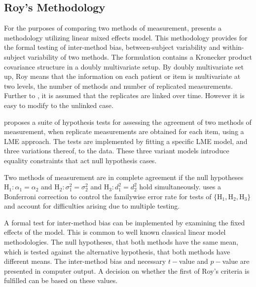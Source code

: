 \documentclass[12pt, a4paper]{report}
\theoremstyle{plain}
\theoremstyle{definition}
\theoremstyle{remark}
\begin{document}
			
			
			
			
			
			
			
			\subsection{Roy's Methodology}
			
			For the purposes of comparing two methods of measurement, \citet{ARoy2009} presents a methodology utilizing linear mixed effects model. This methodology provides for the formal testing of inter-method bias, between-subject variability and within-subject variability of two methods. The formulation contains a Kronecker product covariance structure in a doubly multivariate setup. By doubly multivariate set up, Roy means that the information on each patient or item is multivariate at two levels, the number of methods and number of replicated measurements. Further to \citet{lam}, it is assumed that the replicates are linked over time. However it is easy to modify to the unlinked case.
			
			
			
			
			\citet{ARoy2009} proposes a suite of hypothesis tests for assessing the agreement of two methods of measurement, when replicate measurements are obtained for each item, using a LME approach. The tests are implemented by fitting a specific LME model, and three variations thereof, to the data. These three variant models introduce equality constraints that act null hypothesis cases.
			
			Two methods of measurement are in complete agreement if the null hypotheses $\mathrm{H}_1\colon \alpha_1 = \alpha_2$ and $\mathrm{H}_2\colon \sigma^2_1 = \sigma^2_2 $ and $\mathrm{H}_3\colon d^2_1= d^2_2$ hold simultaneously. \citet{ARoy2009} uses a Bonferroni correction to control the familywise error rate for tests of $\{\mathrm{H}_1, \mathrm{H}_2, \mathrm{H}_3\}$ and account for difficulties arising due to multiple testing. 
			
			A formal test for inter-method bias can be implemented by examining the fixed effects of the model. This is common to well known classical linear model methodologies. The null hypotheses, that both methods have the same mean, which is tested against the alternative hypothesis, that both methods have different means.
			The inter-method bias and necessary $t-$value and $p-$value are presented in computer output. A decision on whether the first of Roy's criteria is fulfilled can be based on these values.
			
\end{document}
